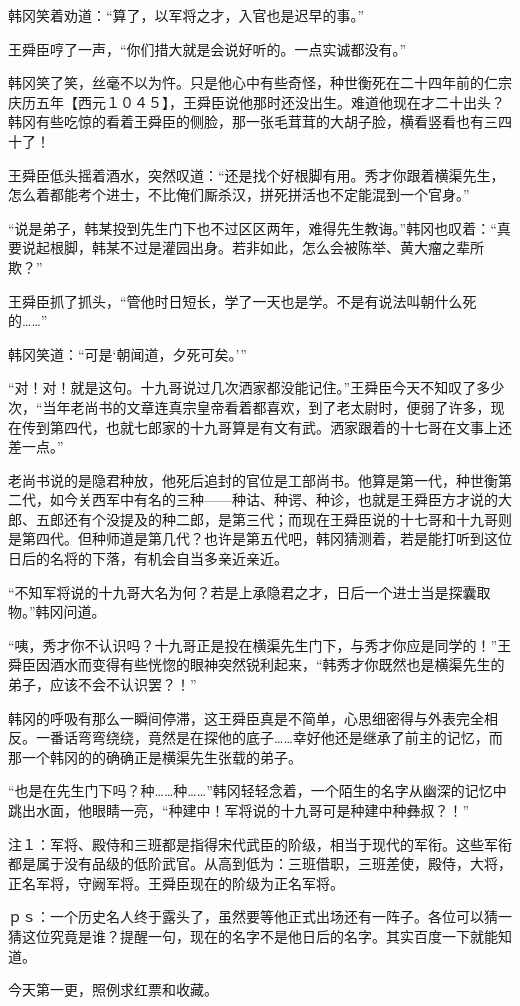 韩冈笑着劝道：“算了，以军将之才，入官也是迟早的事。”

王舜臣哼了一声，“你们措大就是会说好听的。一点实诚都没有。”

韩冈笑了笑，丝毫不以为忤。只是他心中有些奇怪，种世衡死在二十四年前的仁宗庆历五年【西元１０４５】，王舜臣说他那时还没出生。难道他现在才二十出头？韩冈有些吃惊的看着王舜臣的侧脸，那一张毛茸茸的大胡子脸，横看竖看也有三四十了！

王舜臣低头摇着酒水，突然叹道：“还是找个好根脚有用。秀才你跟着横渠先生，怎么着都能考个进士，不比俺们厮杀汉，拼死拼活也不定能混到一个官身。”

“说是弟子，韩某投到先生门下也不过区区两年，难得先生教诲。”韩冈也叹着：“真要说起根脚，韩某不过是灌园出身。若非如此，怎么会被陈举、黄大瘤之辈所欺？”

王舜臣抓了抓头，“管他时日短长，学了一天也是学。不是有说法叫朝什么死的……”

韩冈笑道：“可是‘朝闻道，夕死可矣。’”

“对！对！就是这句。十九哥说过几次洒家都没能记住。”王舜臣今天不知叹了多少次，“当年老尚书的文章连真宗皇帝看着都喜欢，到了老太尉时，便弱了许多，现在传到第四代，也就七郎家的十九哥算是有文有武。洒家跟着的十七哥在文事上还差一点。”

老尚书说的是隐君种放，他死后追封的官位是工部尚书。他算是第一代，种世衡第二代，如今关西军中有名的三种——种诂、种谔、种诊，也就是王舜臣方才说的大郎、五郎还有个没提及的种二郎，是第三代；而现在王舜臣说的十七哥和十九哥则是第四代。但种师道是第几代？也许是第五代吧，韩冈猜测着，若是能打听到这位日后的名将的下落，有机会自当多亲近亲近。

“不知军将说的十九哥大名为何？若是上承隐君之才，日后一个进士当是探囊取物。”韩冈问道。

“咦，秀才你不认识吗？十九哥正是投在横渠先生门下，与秀才你应是同学的！”王舜臣因酒水而变得有些恍惚的眼神突然锐利起来，“韩秀才你既然也是横渠先生的弟子，应该不会不认识罢？！”

韩冈的呼吸有那么一瞬间停滞，这王舜臣真是不简单，心思细密得与外表完全相反。一番话弯弯绕绕，竟然是在探他的底子……幸好他还是继承了前主的记忆，而那一个韩冈的的确确正是横渠先生张载的弟子。

“也是在先生门下吗？种……种……”韩冈轻轻念着，一个陌生的名字从幽深的记忆中跳出水面，他眼睛一亮，“种建中！军将说的十九哥可是种建中种彝叔？！”

注１：军将、殿侍和三班都是指得宋代武臣的阶级，相当于现代的军衔。这些军衔都是属于没有品级的低阶武官。从高到低为：三班借职，三班差使，殿侍，大将，正名军将，守阙军将。王舜臣现在的阶级为正名军将。

ｐｓ：一个历史名人终于露头了，虽然要等他正式出场还有一阵子。各位可以猜一猜这位究竟是谁？提醒一句，现在的名字不是他日后的名字。其实百度一下就能知道。

今天第一更，照例求红票和收藏。

